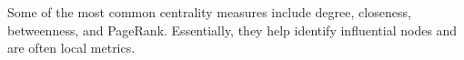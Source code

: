 \documentclass[preview]{standalone}
\begin{document}
Some of the most common centrality measures include degree, closeness, betweenness, and PageRank. Essentially, they help identify influential nodes and are often local metrics.\\
\end{document}
